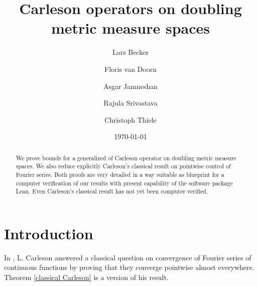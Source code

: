 
\title{Carleson operators on doubling metric measure spaces}

\author{Lars Becker \and Floris van Doorn \and Asgar Jamneshan \and Rajula Srivastava \and Christoph Thiele}

\date{\today}

\begin{abstract}
    We prove  bounds for a generalized of Carleson operator on doubling metric measure spaces. We also
    reduce explicitly Carleson's classical result on
    pointwise control of Fourier series.
    Both proofs are very detailed in a way suitable as blueprint for a computer verification of our results with present capability of the software package Lean. Even Carleson's classical result has not yet been computer verified.
\end{abstract}

\maketitle

\tableofcontents

\chapter{Introduction}

In \cite{carleson}, L. Carleson
answered a classical question on convergence of
Fourier series of continuous functions by proving that they converge pointwise almost everywhere.
Theorem \ref{classical Carleson} is a version of his result.

